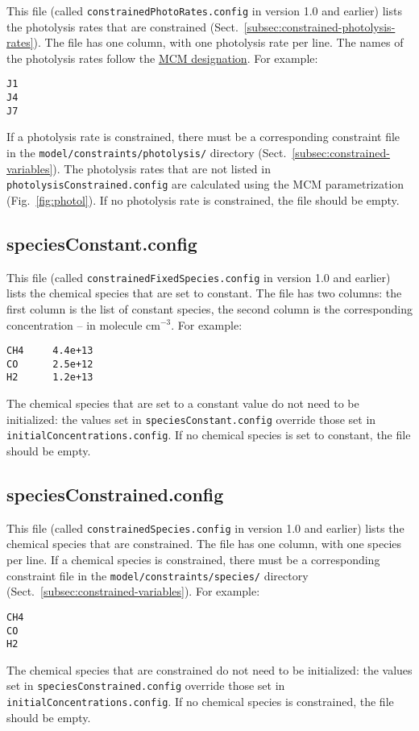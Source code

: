 This file (called \texttt{constrainedPhotoRates.config} in version 1.0
and earlier) lists the photolysis rates that are constrained
(Sect.~\ref{subsec:constrained-photolysis-rates}). The file has one
column, with one photolysis rate per line. The names of the photolysis
rates follow the
\href{https://mcm.york.ac.uk/MCM/rates/photolysis}{MCM designation}.
For example:

\begin{verbatim}
J1
J4
J7
\end{verbatim}

If a photolysis rate is constrained, there must be a corresponding
constraint file in the \texttt{model/constraints/photolysis/}
directory (Sect.~\ref{subsec:constrained-variables}). The photolysis
rates that are not listed in \texttt{photolysisConstrained.config} are
calculated using the MCM parametrization (Fig.~\ref{fig:photol}). If
no photolysis rate is constrained, the file should be empty.

\subsection{speciesConstant.config} \label{subsec:speciesconstant}

This file (called \texttt{constrainedFixedSpecies.config} in version
1.0 and earlier) lists the chemical species that are set to
constant. The file has two columns: the first column is the list of
constant species, the second column is the corresponding concentration
-- in molecule cm$^{-3}$. For example:

\begin{verbatim}
CH4     4.4e+13
CO      2.5e+12
H2      1.2e+13
\end{verbatim}

The chemical species that are set to a constant value do not need to
be initialized: the values set in \texttt{speciesConstant.config}
override those set in \texttt{initialConcentrations.config}. If no
chemical species is set to constant, the file should be empty.

\subsection{speciesConstrained.config} \label{subsec:speciesconstrained}

This file (called \texttt{constrainedSpecies.config} in version 1.0
and earlier) lists the chemical species that are constrained. The file
has one column, with one species per line. If a chemical species is
constrained, there must be a corresponding constraint file in the
\texttt{model/constraints/species/} directory
(Sect.~\ref{subsec:constrained-variables}). For example:

\begin{verbatim}
CH4
CO
H2
\end{verbatim}

The chemical species that are constrained do not need to be
initialized: the values set in \texttt{speciesConstrained.config}
override those set in \texttt{initialConcentrations.config}. If no
chemical species is constrained, the file should be empty.
